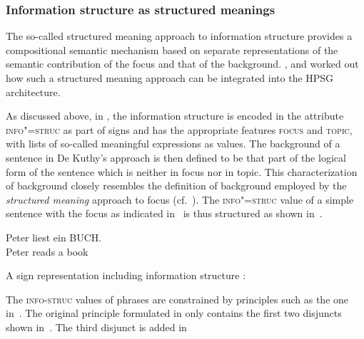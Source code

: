 \documentclass[output=paper
	        ,collection
	        ,collectionchapter
 	        ,biblatex
                ,babelshorthands
                ,newtxmath
                ,draftmode
                ,colorlinks, citecolor=brown
]{langscibook}
\begin{document}
\subsubsection{Information structure as structured meanings \citep{deKuthy2002a}}
\label{sec:struc-meaning}
The so-called structured meaning approach to information structure
\citep{Stechow81a-u,Jacobs83a,Krifka92a-u-kopiert} provides a
compositional semantic mechanism based on separate representations of
the semantic contribution of the focus and that of the
background. \citet{deKuthy2002a}, \cite{dKM2003a} and
\cite{Webelhuth2007a-u} worked out how such a structured meaning
approach can be integrated into the HPSG architecture.

As discussed above, in \cite{deKuthy2002a}, the information structure
is encoded in the attribute \textsc{info"=struc} as part of signs and
has the appropriate features \textsc{focus} and \textsc{topic}, with
lists of so-called meaningful expressions as values. The background of
a sentence in De Kuthy's approach is then defined to be that part of
the logical form of the sentence which is neither in focus nor in
topic.  This characterization of background closely resembles the
definition of background employed by the \textit{structured meaning}
approach to focus (cf.\ \citealt{Krifka92a-u-kopiert}).  The
\textsc{info"=struc} value of a simple sentence with the focus as
indicated in~ is thus structured as shown
in~.
\begin{exe}
  \ex\label{ex:peter} \gll Peter {\LF}liest ein BUCH{\RF}.\\
           Peter {}reads a book\\
\end{exe}
\ea
 A sign representation including information structure \citep[163]{deKuthy2002a}:
\begin{center}

    \label{fig:focus-backgr}
  \end{center}\unskip
\z
The \textsc{info-struc} values of phrases are constrained by
principles such as the one in~. The
original principle formulated in \cite[169]{deKuthy2002a} only
contains the first two disjuncts shown
in~. The third disjunct is added in
\end{document}
